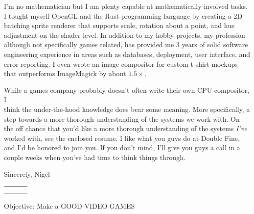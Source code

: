 \documentclass[12pt]{article}
\def \author{Nigel Baillie}
\renewcommand{\section}[1]{{\Huge{#1}}\vspace{2 mm}}
\begin{document}
I'm no mathematician but I am plenty capable at mathematically involved
tasks. I tought myself OpenGL and the Rust programming language by creating
a 2D batching sprite renderer that supports scale, rotation about a point, and
hue adjustment on the shader level. In addition to my hobby projects, my profession
although not specifically games related, has provided me 3 years of solid
software engineering experience in areas such as databases, deployment, user
interface, and error reporting. I even wrote an image compositor for custom t-shirt
mockups that outperforms ImageMagick by about $1.5\times$.
\newline

While a games company probably doesn't often write their own CPU compositor,
I \\ think the under-the-hood knowledge does bear some meaning. More specifically,
a step towards a more thorough understanding of the systems we work with.
On the off chance that you'd like a more thorough understanding of the systems
\textit{I've} worked with, see the enclosed resume. I like what you guys do at
Double Fine, and I'd be honored to join you. If you don't mind, I'll give you guys
a call in a couple weeks when you've had time to think things through.
\newline

Sincerely,
\newline
Nigel


\pagebreak



\begin{tabular} {
  p{}
  p{}
  p{}
}
  \begin{flushleft}
  \end{flushleft}
  &
  \begin{center}
    {\Huge{\author}}\\
  \end{center}
  &
  \begin{flushright}
  \end{flushright}
\end{tabular}

\section{Objective:} Make a GOOD VIDEO GAMES
\newline
\end{document}
